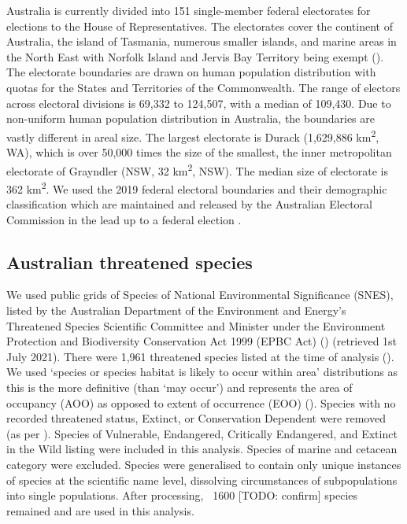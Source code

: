 \documentclass[a4paper,11pt]{article}
\begin{document}
Australia is currently divided into 151 single-member federal electorates for elections to the House of Representatives. The electorates cover the continent of Australia, the island of Tasmania, numerous smaller islands, and marine areas in the North East with Norfolk Island and Jervis Bay Territory being exempt (\cite{parliamentofaustraliaElectoralDivisions2018}). The electorate boundaries are drawn on human population distribution with quotas for the States and Territories of the Commonwealth. The range of electors across electoral divisions is 69,332 to 124,507, with a median of 109,430. Due to non-uniform human population distribution in Australia, the boundaries are vastly different in areal size. The largest electorate is Durack (1,629,886 km\textsuperscript{2}, WA), which is over 50,000 times the size of the smallest, the inner metropolitan electorate of Grayndler (NSW, 32 km\textsuperscript{2}, NSW). The median size of electorate is 362 km\textsuperscript{2}. We used the 2019 federal electoral boundaries and their demographic classification which are maintained and released by the Australian Electoral Commission in the lead up to a federal election \cite{australiaelectoralcomissionFederalElectoralBoundaries2019}. 

\subsection{Australian threatened species}

We used public grids of Species of National Environmental Significance (SNES), listed by the Australian Department of the Environment and Energy’s Threatened Species Scientific Committee and Minister under the Environment Protection and Biodiversity Conservation Act 1999 (EPBC Act) (\cite{commonwealthofaustraliaThreatenedSpeciesEPBC2021}) (retrieved 1st July 2021). There were 1,961 threatened species listed at the time of analysis (\cite{commonwealthofaustraliaThreatenedSpeciesEPBC2021}). We used ‘species or species habitat is likely to occur within area’ distributions as this is the more definitive (than ‘may occur’) and represents the area of occupancy (AOO) as opposed to extent of occurrence (EOO) (\cite{gastonSizesSpeciesGeographic2009, lloydEstimatingSpatialCoverage2020}). Species with no recorded threatened status, Extinct, or Conservation Dependent were removed (as per \cite{wardNationalscaleDatasetThreats}). Species of Vulnerable, Endangered, Critically Endangered, and Extinct in the Wild listing were included in this analysis. Species of marine and cetacean category were excluded. Species were generalised to contain only unique instances of species at the scientific name level, dissolving circumstances of subpopulations into single populations. After processing, ~1600 [TODO: confirm] species remained and are used in this analysis. 
\end{document}
